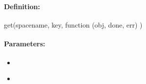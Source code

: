 %
%
%


\pagebreak
\subsubsection{}
\label{api:nodejs:get}


\paragraph{Definition:}
\begin{javascriptcode}
get(spacename, key, function (obj, done, err) {})
\end{javascriptcode}
\paragraph{Parameters:}
\begin{itemize}[noitemsep]
\item {}\\

\item {}\\

\end{itemize}

